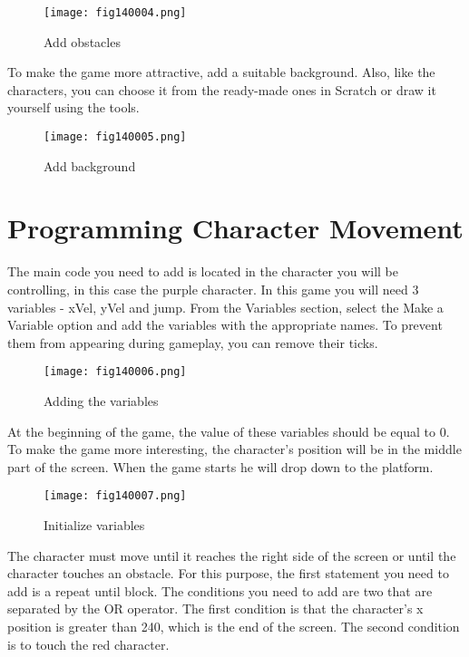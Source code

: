 \begin{figure}[H]
   \centering
   \texttt{[image: fig140004.png]}
   \caption{Add obstacles}
\label{fig140004}
\end{figure}

To make the game more attractive, add a suitable background. Also, like the characters, you can choose it from the ready-made ones in Scratch or draw it yourself using the tools.

\begin{figure}[H]
   \centering
   \texttt{[image: fig140005.png]}
   \caption{Add background}
\label{fig140005}
\end{figure}

\section{Programming Character Movement}

The main code you need to add is located in the character you will be controlling, in this case the purple character. In this game you will need 3 variables - xVel, yVel and jump. From the Variables section, select the Make a Variable option and add the variables with the appropriate names. To prevent them from appearing during gameplay, you can remove their ticks.

\begin{figure}[H]
   \centering
   \texttt{[image: fig140006.png]}
   \caption{Adding the variables}
\label{fig140006}
\end{figure}

At the beginning of the game, the value of these variables should be equal to 0. To make the game more interesting, the character's position will be in the middle part of the screen. When the game starts he will drop down to the platform.

\begin{figure}[H]
   \centering
   \texttt{[image: fig140007.png]}
   \caption{Initialize variables}
\label{fig140007}
\end{figure}

The character must move until it reaches the right side of the screen or until the character touches an obstacle. For this purpose, the first statement you need to add is a repeat until block. The conditions you need to add are two that are separated by the OR operator. The first condition is that the character's x position is greater than 240, which is the end of the screen. The second condition is to touch the red character.

